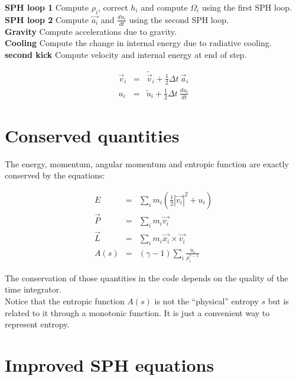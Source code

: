 \documentclass[a4paper,10pt]{article}
\begin{document}
\textbf{SPH loop 1} Compute $\rho_i$, correct $h_i$ and compute $\Omega_i$ using the first SPH loop. \\

\textbf{SPH loop 2} Compute $\vec{a_i}$ and $\frac{du_i}{dt}$ using the second SPH loop. \\

\textbf{Gravity} Compute accelerations due to gravity. \\

\textbf{Cooling} Compute the change in internal energy due to radiative cooling. \\

\textbf{second kick} Compute velocity and internal energy at end of step. 

\begin{eqnarray*}
 \vec{v}_i &=& \tilde{\vec{v}}_i + \textstyle\frac{1}{2}\Delta t ~\vec{a}_i \\
 u_i &=& \tilde{u}_i + \textstyle\frac{1}{2}\Delta t ~\frac{du_i}{dt}
\end{eqnarray*}




\section{Conserved quantities}

The energy, momentum, angular momentum and entropic function are exactly conserved by the equations:

\begin{eqnarray}
E &=&\sum_i m_i\left(\frac{1}{2}|\vec{v_i}|^2+u_i\right)\\
\vec{P} &=&\sum_i m_i \vec{v_i}\\
\vec{L} &=& \sum_i m_i \vec{x_i} \times \vec{v_i}\\ 
A(s) &=& \left(\gamma -1 \right)\sum_i \frac{u_i}{\rho_i^{\gamma - 1}}
\end{eqnarray}

The conservation of those quantities in the code depends on the quality of the time integrator. \\
Notice that the entropic function $A(s)$ is not the ``physical'' entropy $s$ but is related to it through a monotonic
function. It is just a convenient way to represent entropy.

\section{Improved SPH equations}
\end{document}
